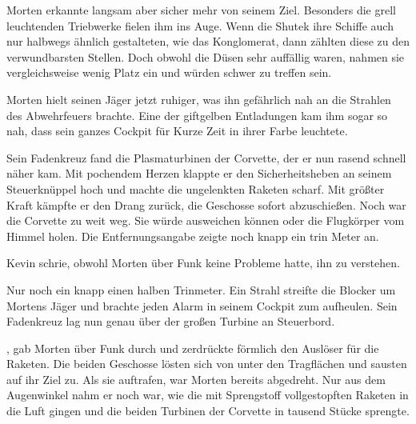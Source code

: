 \par

Morten erkannte langsam aber sicher mehr von seinem Ziel. Besonders die grell leuchtenden Triebwerke fielen ihm ins Auge. Wenn die Shutek ihre Schiffe auch nur halbwegs ähnlich gestalteten, wie das Konglomerat, dann zählten diese zu den verwundbarsten Stellen. Doch obwohl die Düsen sehr auffällig waren, nahmen sie vergleichsweise wenig Platz ein und würden schwer zu treffen sein.

\par

Morten hielt seinen Jäger jetzt ruhiger, was ihn gefährlich nah an die Strahlen des Abwehrfeuers brachte. Eine der giftgelben Entladungen kam ihm sogar so nah, dass sein ganzes Cockpit für Kurze Zeit in ihrer Farbe leuchtete.

\par

Sein Fadenkreuz fand die Plasmaturbinen der Corvette, der er nun rasend schnell näher kam. Mit pochendem Herzen klappte er den Sicherheitsheben an seinem Steuerknüppel hoch und machte die ungelenkten Raketen scharf. Mit größter Kraft kämpfte er den Drang zurück, die Geschosse sofort abzuschießen. Noch war die Corvette zu weit weg. Sie würde ausweichen können oder die Flugkörper vom Himmel holen. Die Entfernungsangabe zeigte noch knapp ein trin Meter an.

\par

 Kevin schrie, obwohl Morten über Funk keine Probleme hatte, ihn zu verstehen.

\par

Nur noch ein knapp einen halben Trinmeter. Ein Strahl streifte die Blocker um Mortens Jäger und brachte jeden Alarm in seinem Cockpit zum aufheulen. Sein Fadenkreuz lag nun genau über der großen Turbine an Steuerbord.

\par

, gab Morten über Funk durch und zerdrückte förmlich den Auslöser für die Raketen. Die beiden Geschosse lösten sich von unter den Tragflächen und sausten auf ihr Ziel zu. Als sie auftrafen, war Morten bereits abgedreht. Nur aus dem Augenwinkel nahm er noch war, wie die mit Sprengstoff vollgestopften Raketen in die Luft gingen und die beiden Turbinen der Corvette in tausend Stücke sprengte.

\par

